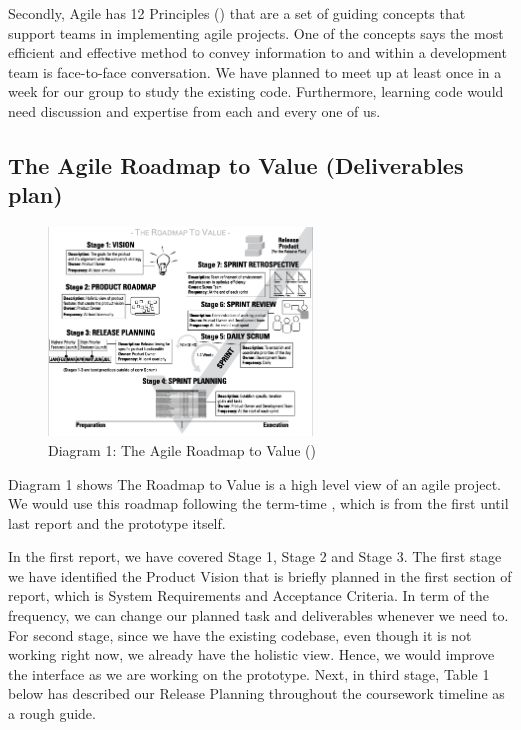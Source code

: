 			Secondly, Agile has 12 Principles (\cite{agileProjectManagementForDummies}) that are a set of guiding concepts that support teams in implementing agile projects. One of the concepts says the most efficient and effective method to convey information to and within a development team is face-to-face conversation. We have planned to meet up at least once in a week for our group to study the existing code. Furthermore, learning code would need discussion and expertise from each and every one of us.
			
	\newpage
	
	\subsection*{The Agile Roadmap to Value (Deliverables plan)}
		\begin{figure}[htbp]
			\centerline{\includegraphics[width=7cm]{resources/roadmaptovalue.jpg}}
				\caption{Diagram 1: The Agile Roadmap to Value (\cite{agileRoadmapToValue})}
		\end{figure}
		
		Diagram 1 shows The Roadmap to Value is a high level view of an agile project. We would use this roadmap following the term-time , which is from the first until last report and the prototype itself.
		
		In the first report, we have covered Stage 1, Stage 2 and Stage 3. The first stage we have identified the Product Vision that is briefly planned in the first section of report, which is System Requirements and Acceptance Criteria. In term of the frequency, we can change our planned task and deliverables whenever we need to. For second stage, since we have the existing codebase, even though it is not working right now, we already have the holistic view. Hence, we would improve the interface as we are working on the prototype. Next, in third stage, Table 1 below has described our Release Planning throughout the coursework timeline as a rough guide. 
		
